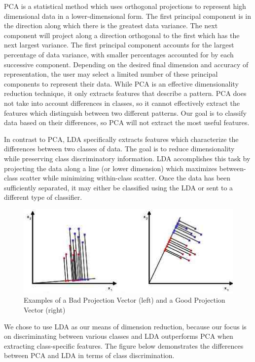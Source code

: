 \documentclass{article}[11pt]
\begin{document}
PCA is a statistical method which uses orthogonal projections to represent high dimensional data in a lower-dimensional form. The first principal component is in the direction along which there is the greatest data variance. The next component will project along a direction orthogonal to the first which has the next largest variance. The first principal component accounts for the largest percentage of data variance, with smaller percentages accounted for by each successive component. Depending on the desired final dimension and accuracy of representation, the user may select a limited number of these principal components to represent their data. While PCA is an effective dimensionality reduction technique, it only extracts features that describe a pattern. PCA does not take into account differences in classes, so it cannot effectively extract the features which distinguish between two different patterns.  Our goal is to classify data based on their differences, so PCA will not extract the most useful features. 

In contrast to PCA, LDA specifically extracts features which characterize  the differences between two classes of data. The goal is to reduce dimensionality while preserving class discriminatory information. LDA accomplishes this task by projecting the data along a line (or lower dimension) which maximizes between-class scatter while minimizing within-class scatter. Once the data has been sufficiently separated, it may either be classified using the LDA or sent to a different type of classifier.   

\begin{figure}[H]
   \centering
   \includegraphics[scale = 0.6]{Images/Bad LDA.jpg} %
   \caption{Examples of a Bad Projection Vector (left) and a Good Projection Vector (right) \cite{GutierrezPP}}
   \label{fig:ProjVect}
\end{figure}

We chose to use LDA as our means of dimension reduction, because our focus is on discriminating between various classes and LDA outperforms PCA when extracting class-specific features. The figure below demonstrates the differences between PCA and LDA in terms of class discrimination.
\end{document}
